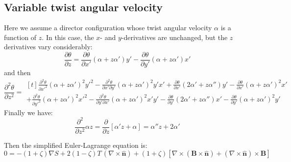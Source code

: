 \documentclass[reqno]{article}
\newcommand{\n}{\hat{\mathbf{n}}}
\begin{document}
\subsection{Variable twist angular velocity}

Here we assume a director configuration whose twist angular velocity $\alpha$ is a function of $z$.
In this case, the $x$- and $y$-derivatives are unchanged, but the $z$ derivatives vary considerably:
\begin{equation}
    \frac{\partial \theta}{\partial z}
    =
    \frac{\partial \theta}{\partial x'} (\alpha + z\alpha') y'
    -
    \frac{\partial \theta}{\partial y'} (\alpha + z \alpha') x'
\end{equation}
and then
\begin{equation}
    \frac{\partial^2 \theta}{\partial z^2}
    =
    \begin{multlined}[t]
        \frac{\partial^2 \theta}{\partial x'^2} (\alpha + z\alpha')^2 y'^2
        -
        \frac{\partial^2 \theta}{\partial x' \partial y'} (\alpha + z\alpha')^2 y' x'
        +
        \frac{\partial \theta}{\partial x'} (2 \alpha' + z \alpha'') y'
        -
        \frac{\partial \theta}{\partial x'} (\alpha + z\alpha')^2 x' \\
        +
        \frac{\partial^2 \theta}{\partial y'^2} (\alpha + z \alpha')^2 x'^2
        -
        \frac{\partial^2 \theta}{\partial y' \partial x'} (\alpha + z \alpha')^2 x' y'
        -
        \frac{\partial \theta}{\partial y'} (2 \alpha' + z \alpha'') x'
        -
        \frac{\partial \theta}{\partial y'} (\alpha + z \alpha')^2 y'
    \end{multlined}
\end{equation}
Finally we have:
\begin{equation}
    \frac{\partial^2}{\partial z^2} \alpha z
    =
    \frac{\partial}{\partial z} \left[
        \alpha' z + \alpha
    \right]
    =
    \alpha'' z + 2 \alpha'
\end{equation}

\theendnotes

Then the simplified Euler-Lagrange equation is:
\begin{equation}
    0
    =
    -(1 + \zeta) \nabla S
    + 2 (1 - \zeta) T \, \left(\nabla \times \n\right)
    + (1 + \zeta) \left[ 
        \nabla \times \left( \mathbf{B} \times \n \right)
        + \left( \nabla \times \n \right) \times \mathbf{B}
    \right]
\end{equation}
\end{document}
